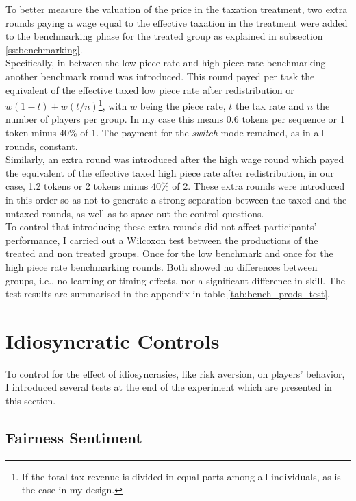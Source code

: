     To better measure the valuation of the price in the taxation treatment, two extra rounds paying a wage equal to the effective taxation in the treatment were added to the benchmarking phase for the treated group as explained in subsection \ref{ss:benchmarking}.\\
    
    Specifically, in between the low piece rate and high piece rate benchmarking another benchmark round was introduced. This round payed per task the equivalent of the effective taxed low piece rate after redistribution or $w(1-t)+ w(t/n)$\footnote{If the total tax revenue is divided in equal parts among all individuals, as is the case in my design.}, with $w$ being the piece rate, $t$ the tax rate and $n$ the number of players per group. In my case this means 0.6 tokens per sequence or 1 token minus 40\% of 1. The payment for the \textit{switch} mode remained, as in all rounds, constant.\\
    
    Similarly, an extra round was introduced after the high wage round which payed the equivalent of the effective taxed high piece rate after redistribution, in our case, 1.2 tokens or 2 tokens minus 40\% of 2. These extra rounds were introduced in this order so as not to generate a strong separation between the taxed and the untaxed rounds, as well as to space out the control questions. \\ 
    
    To control that introducing these extra rounds did not affect participants' performance, I carried out a Wilcoxon test between the productions of the treated and non treated groups. Once for the low benchmark and once for the high piece rate benchmarking rounds. Both showed no differences between groups, i.e., no learning or timing effects, nor a significant difference in skill. The test results are summarised in the appendix in table \ref{tab:bench_prods_test}.
    
    \section{Idiosyncratic Controls}
    
    To control for the effect of idiosyncrasies, like risk aversion, on players' behavior, I introduced several tests at the end of the experiment which are presented in this section. 
    
    \subsection{Fairness Sentiment}
    
